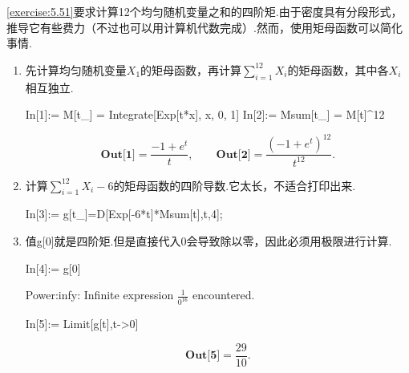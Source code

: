 \begin{example}[均匀变量之和的四阶矩]\label{ex:12.6.6}
\autoref{exercise:5.51}要求计算12个均匀随机变量之和的四阶矩.由于密度具有分段形式，推导它有些费力（不过也可以用计算机代数完成）.然而，使用矩母函数可以简化事情.
\begin{enumerate}[label=(\arabic*)]
\item 先计算均匀随机变量$X_1$的矩母函数，再计算$\sum_{i=1}^{12}X_i$的矩母函数，其中各$X_i$相互独立.
\begin{sourcecode}
In[1]:= M[t_] = Integrate[Exp[t*x], {x, 0, 1}]
In[2]:= Msum[t_] = M[t]^12
\end{sourcecode}
$$\textbf{Out[1]}=\frac{-1+e^t}{t},\qquad\textbf{Out[2]}=\frac{(-1+e^t)^{12}}{t^{12}}.$$
\item 计算$\sum_{i=1}^{12}X_i-6$的矩母函数的四阶导数.它太长，不适合打印出来.
\begin{sourcecode}
In[3]:= g[t_]=D[Exp[-6*t]*Msum[t],{t,4}];
\end{sourcecode}
\item 值g[0]就是四阶矩.但是直接代入0会导致除以零，因此必须用极限进行计算.
\begin{sourcecode}
In[4]:= g[0]
\end{sourcecode}
\noindent Power:infy: Infinite expression $\frac{1}{0^{16}}$ encountered.
\begin{sourcecode}
In[5]:= Limit[g[t],t->0]
\end{sourcecode}
$$\textbf{Out[5]}=\frac{29}{10}.$$
\end{enumerate}
\end{example}

